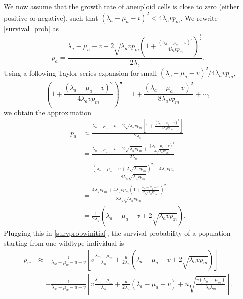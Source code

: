 \documentclass[12pt]{extarticle}
\begin{document}
\begin{appendices}
We now assume that the growth rate of aneuploid cells is close to zero (either positive or negative), such that  $\left(\lambda_a-\mu_a-v\right)^2 < 4\lambda_avp_m$.
We rewrite \cref{survival_prob} as
\begin{equation}
p_a=\frac{\lambda_a-\mu_a-v+2\sqrt{\lambda_a vp_m}\left(1+\frac{\left(\lambda_a-\mu_a-v\right)^2}{4\lambda_avp_m}\right)^{\frac12}}{2\lambda_a} .
\end{equation}
Using a following Taylor series expansion for small $\left(\lambda_a-\mu_a-v\right)^2 / 4\lambda_avp_m$,
\begin{equation*}
\left(1+\frac{\left(\lambda_a-\mu_a-v\right)^2}{4\lambda_avp_m}\right)^{\frac{1}{2}}=1+\frac{\left(\lambda_a-\mu_a-v\right)^2}{8\lambda_avp_m}+\cdots,
\end{equation*}
we obtain the approximation
\begin{equation}
\begin{aligned}
p_a&\approx\frac{\lambda_a-\mu_a-v+2\sqrt{\lambda_a vp_m}\left[1+\frac{\left(\lambda_a-\mu_a-v\right)^2}{8\lambda_avp_m}\right]}{2\lambda_a}\\
&=\frac{\lambda_a-\mu_a-v+2\sqrt{\lambda_a vp_m}+\frac{\left(\lambda_a-\mu_a-v\right)^2}{4\sqrt{\lambda_avp_m}}}{2\lambda_a}\\
&=\frac{\left(\lambda_a-\mu_a-v+2\sqrt{\lambda_avp_m}\right)^2+4\lambda_avp_m}{8\lambda_a\sqrt{\lambda_avp_m}}\\
&=\frac{4\lambda_avp_m+4\lambda_avp_m\left(1+\frac{\lambda_a-\mu_a-v}{2\sqrt{\lambda_avp_m}}\right)^2}{8\lambda_a\sqrt{\lambda_avp_m}}\\
&=\frac{1}{2\lambda_a}\left(\lambda_a-\mu_a-v+2\sqrt{\lambda_avp_m}\right).
\end{aligned}
\end{equation}
Plugging this in \cref{survprobwinitial}, the survival probability of a population starting from one wildtype individual is
\begin{equation}\label{scenario3}
\begin{aligned}
p_w&\approx-\frac{1}{\lambda_w-\mu_w-u-v}\left[v\frac{\lambda_m-\mu_m}{\lambda_m}+\frac{u}{2\lambda_a}\left(\lambda_a-\mu_a-v+2\sqrt{\lambda_avp_m}\right)\right]\\
&=-\frac{1}{\lambda_w-\mu_w-u-v}\left[v\frac{\lambda_m-\mu_m}{\lambda_m}+\frac{u}{2\lambda_a}\left(\lambda_a-\mu_a-v\right)+u\sqrt{\frac{v\left(\lambda_m-\mu_m\right)}{\lambda_a\lambda_m}}\right].
\end{aligned}
\end{equation}



\end{appendices}

\end{document}
